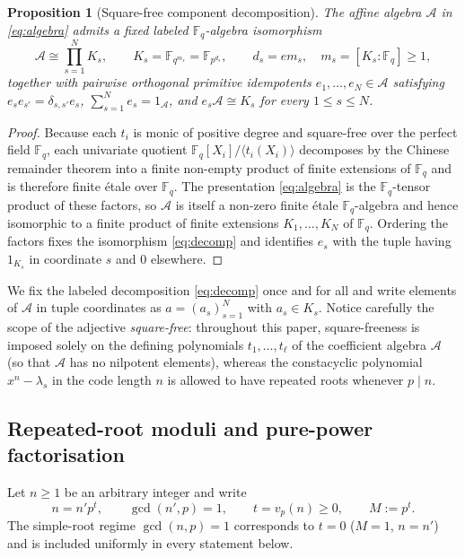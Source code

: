 \documentclass[preprint,12pt]{elsarticle}
\newcommand{\F}{\mathbb F}
\newcommand{\A}{\mathcal A}
\numberwithin{equation}{section}
\theoremstyle{plain}
\newtheorem{proposition}[theorem]{Proposition}
\theoremstyle{definition}
\theoremstyle{remark}
\begin{document}
\begin{proposition}[Square-free component decomposition]\label{prop:decomposition}
The affine algebra $\A$ in \eqref{eq:algebra} admits a fixed labeled $\F_q$-algebra
isomorphism
\begin{equation}\label{eq:decomp}
\A\cong\prod_{s=1}^{N} K_s,
\qquad
K_s=\F_{q^{m_s}}=\F_{p^{d_s}},
\qquad
d_s=e m_s,\quad m_s=[K_s:\F_q]\ge 1,
\end{equation}
together with pairwise orthogonal primitive idempotents $e_1,\dots,e_N\in\A$
satisfying $e_s e_{s'}=\delta_{s,s'}e_s$, $\sum_{s=1}^{N}e_s=1_\A$, and
$e_s\A\cong K_s$ for every $1\le s\le N$.
\end{proposition}

\begin{proof}
Because each $t_i$ is monic of positive degree and square-free over the perfect
field $\F_q$, each univariate quotient $\F_q[X_i]/\langle t_i(X_i)\rangle$
decomposes by the Chinese remainder theorem into a finite non-empty product of
finite extensions of $\F_q$ and is therefore finite \'etale over $\F_q$. The
presentation \eqref{eq:algebra} is the $\F_q$-tensor product of these factors,
so $\A$ is itself a non-zero finite \'etale $\F_q$-algebra and hence isomorphic
to a finite product of finite extensions $K_1,\dots,K_N$ of $\F_q$. Ordering the
factors fixes the isomorphism \eqref{eq:decomp} and identifies $e_s$ with the
tuple having $1_{K_s}$ in coordinate $s$ and $0$ elsewhere.
\end{proof}

We fix the labeled decomposition \eqref{eq:decomp} once and for all and write
elements of $\A$ in tuple coordinates as $a=(a_s)_{s=1}^{N}$ with $a_s\in K_s$.
Notice carefully the scope of the adjective \emph{square-free}: throughout this
paper, square-freeness is imposed solely on the defining polynomials
$t_1,\dots,t_\ell$ of the coefficient algebra $\A$ (so that $\A$ has no
nilpotent elements), whereas the constacyclic polynomial $x^n-\lambda_s$ in the
code length $n$ is allowed to have repeated roots whenever $p\mid n$.

\subsection{Repeated-root moduli and pure-power factorisation}\label{sec:factorisation}

Let $n\ge 1$ be an arbitrary integer and write
\begin{equation}\label{eq:length-decomp}
n=n'p^t,\qquad \gcd(n',p)=1,\qquad t=v_p(n)\ge 0,\qquad M:=p^t.
\end{equation}
The simple-root regime $\gcd(n,p)=1$ corresponds
to $t=0$ ($M=1$, $n=n'$) and is included uniformly in every statement below.
\end{document}
